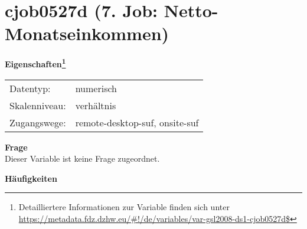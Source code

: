 
    \setcounter{footnote}{0}

    \vspace*{-1.8cm}
	\section{cjob0527d (7. Job: Netto-Monatseinkommen)}
	\label{section:cjob0527d}



    \vspace*{0.5cm}
    \noindent\textbf{Eigenschaften\footnote{Detailliertere Informationen zur Variable finden sich unter
		\url{https://metadata.fdz.dzhw.eu/\#!/de/variables/var-gsl2008-ds1-cjob0527d$}}}\\
	\begin{tabularx}{\hsize}{@{}lX}
	Datentyp: & numerisch \\
	Skalenniveau: & verhältnis \\
	Zugangswege: &
	  remote-desktop-suf, 
	  onsite-suf
 \\
    \end{tabularx}



		\vspace*{0.5cm}
		\noindent\textbf{Frage}\\
		Dieser Variable ist keine Frage zugeordnet.





        		\vspace*{0.5cm}
                \noindent\textbf{Häufigkeiten}

